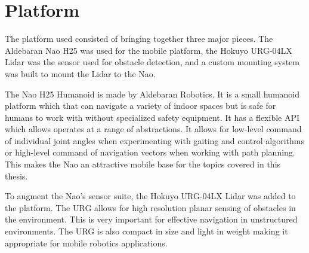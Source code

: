 \chapter{Platform}\label{ch:platform}

The platform used consisted of bringing together three major pieces.
The Aldebaran Nao H25 was used for the mobile platform, the Hokuyo URG-04LX
Lidar was the sensor used for obstacle detection, and a custom mounting system
was built to mount the Lidar to the Nao.

The Nao H25 Humanoid is made by Aldebaran Robotics. It is a small humanoid platform
which that can navigate a variety of indoor spaces but is safe for humans to 
work with without specialized safety equipment. It has a flexible API which allows
operates at a range of abstractions. It allows for low-level command of individual
joint angles when experimenting with gaiting and control algorithms or high-level
command of navigation vectors when working with path planning.
This makes the Nao an attractive mobile base for the topics covered in this thesis.

To augment the Nao's sensor suite, the Hokuyo URG-04LX Lidar was added to the platform.
The URG allows for high resolution planar sensing of obstacles in the environment.
This is very important for effective navigation in unstructured environments.
The URG is also compact in size and light in weight making it appropriate
for mobile robotics applications.

